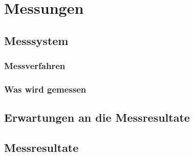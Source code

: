 \section{Messungen}
\subsection{Messsystem}
\subsubsection{Messverfahren}
\subsubsection{Was wird gemessen}
\subsection{Erwartungen an die Messresultate}
\subsection{Messresultate}
